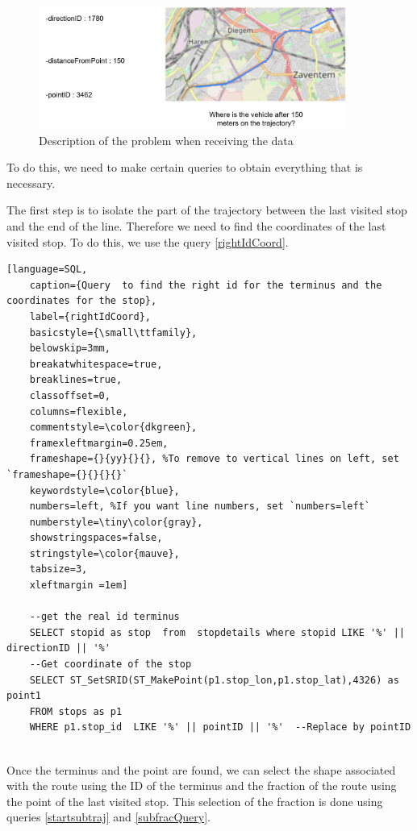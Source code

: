 \documentclass[12pt]{report}
\begin{document}
	\begin{center}
		\begin{figure}
			\centering
			\includegraphics[width=0.9\textwidth]{images/conversionProblem.png}
			\caption{Description of the problem when receiving the data}
			\label{conversionProblem}
		\end{figure}
	\end{center}
	
	
	\vspace{-3cm}
	
	To do this, we need to make certain queries to obtain everything that is necessary.
	
	The first step is to isolate the part of the trajectory between the last visited stop and the end of the line. Therefore we need to find the coordinates of the last visited stop. To do this, we use the query \ref{rightIdCoord}.
	
	\begin{lstlisting}[language=SQL,
	caption={Query  to find the right id for the terminus and the coordinates for the stop},
	label={rightIdCoord},
	basicstyle={\small\ttfamily},
	belowskip=3mm,
	breakatwhitespace=true,
	breaklines=true,
	classoffset=0,
	columns=flexible,
	commentstyle=\color{dkgreen},
	framexleftmargin=0.25em,
	frameshape={}{yy}{}{}, %To remove to vertical lines on left, set `frameshape={}{}{}{}`
	keywordstyle=\color{blue},
	numbers=left, %If you want line numbers, set `numbers=left`
	numberstyle=\tiny\color{gray},
	showstringspaces=false,
	stringstyle=\color{mauve},
	tabsize=3,
	xleftmargin =1em]
	
	--get the real id terminus
	SELECT stopid as stop  from  stopdetails where stopid LIKE '%' || directionID || '%'
	--Get coordinate of the stop 
	SELECT ST_SetSRID(ST_MakePoint(p1.stop_lon,p1.stop_lat),4326) as point1
	FROM stops as p1
	WHERE p1.stop_id  LIKE '%' || pointID || '%'  --Replace by pointID
	
	\end{lstlisting}
	
	
	Once the terminus and the point are found, we can select the shape associated with the route using the ID of the terminus and the fraction of the route using the point of the last visited stop. This selection of the fraction is done using queries \ref{startsubtraj} and \ref{subfracQuery}.
	
\end{document}
